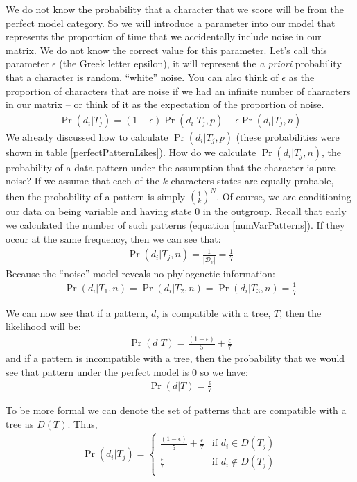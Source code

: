 \documentclass[11pt]{article}
\newcommand{\variablePatternSpace}{\ensuremath{\mathcal{D}_v}}
\begin{document}
We do not know the probability that a character that we score will be from the perfect model category.
So we will introduce a parameter into our model that represents the proportion of time that we accidentally include noise in our matrix.
We do not know the correct value for this parameter.
Let's call this parameter $\epsilon$ (the Greek letter epsilon), it will represent the
{\em a priori} probability that a character is random, ``white'' noise.
You can also think of $\epsilon$ as the proportion of characters that are noise if we
had an infinite number of characters in our matrix -- or think of it as the expectation
of the proportion of noise.
\begin{eqnarray}
	\Pr(d_i|T_j) = (1- \epsilon)\Pr(d_i|T_j,p) + \epsilon\Pr(d_i|T_j,n)
\end{eqnarray}
We already discussed how to calculate $\Pr(d_i|T_j,p)$ (these probabilities were shown in table \ref{perfectPatternLikes}).
How do we calculate $\Pr(d_i|T_j,n)$, the probability of a data pattern under the assumption that
the character is pure noise?
If we assume that each of the $k$ characters states are equally probable, then the probability of a pattern
is simply $\left(\frac{1}{k}\right)^N$.
Of course, we are conditioning our data on being variable and having state 0 in the outgroup.
Recall that early we calculated the number of such patterns (equation \ref{numVarPatterns}).
If they occur at the same frequency, then we can see that:
\begin{eqnarray}
	\Pr(d_i|T_j,n) = \frac{1}{|\variablePatternSpace|} = \frac{1}{7}
\end{eqnarray}
Because the ``noise'' model reveals no phylogenetic information:
\begin{eqnarray}
	\Pr(d_i|T_1,n) = \Pr(d_i|T_2,n) = \Pr(d_i|T_3,n) = \frac{1}{7}
\end{eqnarray}

We can now see that if a pattern, $d$, is compatible with a tree, $T$, then the likelihood will be:
\begin{eqnarray}
	\Pr(d|T) = \frac{(1-\epsilon)}{5} + \frac{\epsilon}{7}
\end{eqnarray}
and if a pattern is incompatible with a tree, then the probability that we would see that pattern
under the perfect model is 0 so we have:
\begin{eqnarray}
	\Pr(d|T) = \frac{\epsilon}{7}
\end{eqnarray}

To be more formal we can denote the set of patterns that are compatible with a tree as $D(T)$. 
Thus,
\begin{eqnarray}\label{specialPerfectNoise}
	\Pr(d_i|T_j) = \left\{ \begin{array}{cc}
\frac{(1-\epsilon)}{5} + \frac{\epsilon}{7} &  \mbox{if } d_i \in D(T_j)   \\ 
	\frac{\epsilon}{7} &  \mbox{if } d_i \notin D(T_j)   \\
\end{array} \right.
\end{eqnarray}
\end{document}
